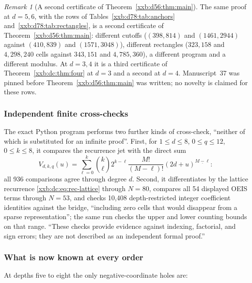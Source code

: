 \documentclass[11pt,a4paper]{article}
\numberwithin{equation}{section}
\theoremstyle{definition}
\theoremstyle{remark}
\newtheorem{remark}[theorem]{Remark}
\theoremstyle{plain}
\newcommand{\fall}[2]{#1^{\underline{#2}}}
\begin{document}
\begin{remark}[A second certificate of Theorem~\ref{xxb:d56:thm:main}]\label{xxb:d78:rem:second56}
The same proof at $d=5,6$, with the rows of
Tables~\ref{xxb:d78:tab:anchors} and~\ref{xxb:d78:tab:rectangles}, is a second
certificate of Theorem~\ref{xxb:d56:thm:main}: different cutoffs
($(398,814)$ and $(1461,2944)$ against $(410,839)$ and $(1571,3048)$),
different rectangles ($323{,}158$ and $4{,}298{,}240$ cells against $343{,}151$
and $4{,}785{,}360$), a different program and a different modulus.  At $d=3,4$
it is a third certificate of Theorem~\ref{xxb:dc:thm:four} at $d=3$ and a
second at $d=4$.  Manuscript~37 was pinned before Theorem~\ref{xxb:d56:thm:main}
was written; no novelty is claimed for these rows.
\end{remark}

\subsubsection{Independent finite cross-checks}

The exact Python program performs two further kinds of cross-check, ``neither
of which is substituted for an infinite proof''.  First, for $1\le d\le8$,
$0\le q\le12$, $0\le k\le8$, it compares the recurrence jet with the direct sum
\begin{equation}\label{xxb:d78:eq:directsum}
 V_{d,k,q}(u)=\sum_{\ell=0}^k\binom k\ell2^{k-\ell}\frac{M!}{(M-\ell)!}\fall{(2d+u)}{M-\ell}:
\end{equation}
all 936 comparisons agree through degree $d$.  Second, it differentiates by
the lattice recurrence \eqref{xxb:dc:eq:rec-lattice} through $N=80$, compares
all 54 displayed OEIS terms through $N=53$, and checks 10,408
depth-restricted integer coefficient identities against the bridge, ``including
zero cells that would disappear from a sparse representation''; the same run
checks the upper and lower counting bounds on that range.  ``These checks
provide evidence against indexing, factorial, and sign errors; they are not
described as an independent formal proof.''

\subsubsection{What is now known at every order}

At depths five to eight the only negative-coordinate holes are:
\end{document}
